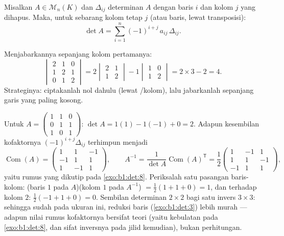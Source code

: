 \begin{theorem}\label{thm:b1:det:cofactor}
Misalkan $A \in \mathcal{M}_n(K)$ dan $\Delta_{ij}$ determinan
$A$ dengan baris $i$ dan kolom $j$ yang dihapus. Maka, untuk sebarang kolom tetap
$j$ (atau baris, lewat transposisi):
\[
\det A = \sum_{i=1}^{n} (-1)^{i+j}\, a_{ij}\, \Delta_{ij} .
\]
\end{theorem}
\admitted

\begin{example}\label{ex:b1:det:cofactor}
Menjabarkannya sepanjang kolom pertamanya:
\[
\begin{vmatrix}
2 & 1 & 0\\
1 & 2 & 1\\
0 & 1 & 2
\end{vmatrix}
= 2\begin{vmatrix} 2 & 1\\ 1 & 2\end{vmatrix}
- 1\begin{vmatrix} 1 & 0\\ 1 & 2\end{vmatrix}
= 2 \times 3 - 2 = 4 .
\]
Strateginya: ciptakanlah nol dahulu (lewat /kolom), lalu jabarkanlah
sepanjang garis yang paling kosong.
\end{example}

\begin{example}
\label{ex:b1:det:cofactorinverse}
Untuk $A = \begin{pmatrix} 1 & 1 & 0\\ 0 & 1 & 1\\ 1 & 0 &
1\end{pmatrix}$: $\det A = 1(1) - 1(-1) + 0 = 2$. Adapun kesembilan
kofaktornya $(-1)^{i+j}\Delta_{ij}$ terhimpun menjadi
\[
\operatorname{Com}(A) = \begin{pmatrix}
1 & 1 & -1\\
-1 & 1 & 1\\
1 & -1 & 1
\end{pmatrix},
\qquad
A^{-1} = \frac{1}{\det A}\operatorname{Com}(A)^{\mathsf T}
= \frac12\begin{pmatrix}
1 & -1 & 1\\
1 & 1 & -1\\
-1 & 1 & 1
\end{pmatrix},
\]
yaitu rumus yang dikutip pada \cref{exo:b1:det:8}. Periksalah satu pasangan
baris-kolom: (baris $1$ pada $A$)(kolom $1$ pada $A^{-1}$) $= \frac12(1 + 1
+ 0) = 1$, dan terhadap kolom $2$: $\frac12(-1 + 1 + 0) = 0$.
Sembilan determinan $2\times2$ bagi satu invers $3\times3$: sehingga sudah
pada ukuran ini, reduksi baris (\cref{exo:b1:det:3}) lebih murah ---
adapun nilai rumus kofaktornya bersifat teori (yaitu kebulatan pada
\cref{exo:b1:det:8}, dan sifat  inversnya pada jilid
kemudian), bukan perhitungan.
\end{example}

